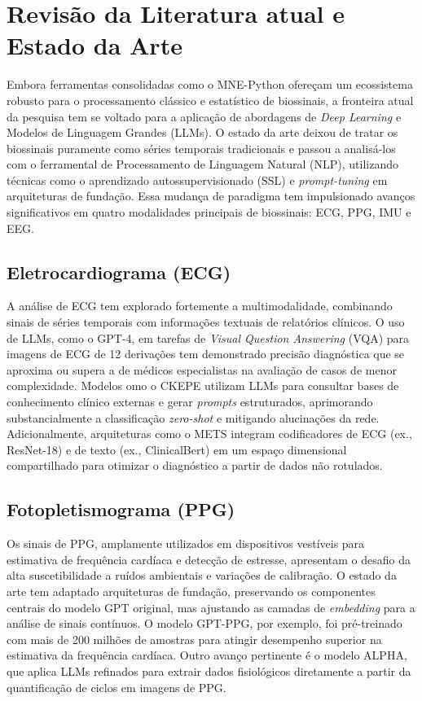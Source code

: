 \section{Revisão da Literatura atual e Estado da Arte}\label{sec:revisao-literatura-estado-arte}

Embora ferramentas consolidadas como o MNE-Python ofereçam um ecossistema
robusto para o processamento clássico e estatístico de biossinais, a fronteira
atual da pesquisa tem se voltado para a aplicação de abordagens de
\textit{Deep Learning} e Modelos de Linguagem Grandes (LLMs).
O estado da arte deixou de tratar os biossinais puramente como séries
temporais tradicionais e passou a analisá-los com o ferramental de Processamento
de Linguagem Natural (NLP), utilizando técnicas como o aprendizado
autossupervisionado (SSL) e \textit{prompt-tuning} em arquiteturas de
fundação. Essa mudança de paradigma tem impulsionado avanços
significativos em quatro modalidades principais de biossinais: ECG, PPG,
IMU e EEG.

\subsection{Eletrocardiograma (ECG)}
A análise de ECG tem explorado fortemente a multimodalidade, combinando
sinais de séries temporais com informações textuais de relatórios
clínicos. O uso de LLMs, como o GPT-4, em tarefas de
\textit{Visual Question Answering} (VQA) para imagens de ECG de 12 derivações
tem demonstrado precisão diagnóstica que se aproxima ou supera a de médicos
especialistas na avaliação de casos de menor complexidade. Modelos 
omo o CKEPE utilizam LLMs para consultar bases de conhecimento clínico externas
e gerar \textit{prompts} estruturados, aprimorando substancialmente a
classificação \textit{zero-shot} e mitigando alucinações da rede.
Adicionalmente, arquiteturas como o METS integram codificadores de ECG (ex.,
ResNet-18) e de texto (ex., ClinicalBert) em um espaço dimensional compartilhado
para otimizar o diagnóstico a partir de dados não rotulados.

\subsection{Fotopletismograma (PPG)}
Os sinais de PPG, amplamente utilizados em dispositivos vestíveis para
estimativa de frequência cardíaca e detecção de estresse, apresentam o
desafio da alta suscetibilidade a ruídos ambientais e variações de
calibração. O estado da arte tem adaptado arquiteturas de fundação,
preservando os componentes centrais do modelo GPT original, mas ajustando as
camadas de \textit{embedding} para a análise de sinais contínuos. O
modelo GPT-PPG, por exemplo, foi pré-treinado com mais de 200 milhões de
amostras para atingir desempenho superior na estimativa da frequência
cardíaca. Outro avanço pertinente é o modelo ALPHA, que aplica LLMs refinados
para extrair dados fisiológicos diretamente a partir da quantificação de ciclos em imagens
de PPG.

